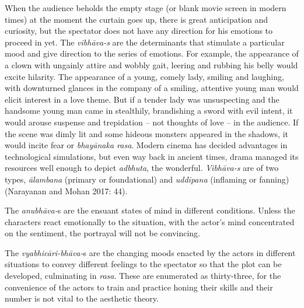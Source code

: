 When the audience beholds the empty stage (or blank movie screen in modern times) at the moment the curtain goes up, there is great anticipation and curiosity, but the spectator does not have any direction for his emotions to proceed in yet. The \textit{vibhāva-s} are the determinants that stimulate a particular mood and give direction to the series of emotions. For example, the appearance of a clown with ungainly attire and wobbly gait, leering and rubbing his belly would excite hilarity. The appearance of a young, comely lady, smiling and laughing, with downturned glances in the company of a smiling, attentive young man would elicit interest in a love theme. But if a tender lady was unsuspecting and the handsome young man came in stealthily, brandishing a sword with evil intent, it would arouse suspense and trepidation – not thoughts of love – in the audience. If the scene was dimly lit and some hideous monsters appeared in the shadows, it would incite fear or \textit{bhayānaka rasa}. Modern cinema has decided advantages in technological simulations, but even way back in ancient times, drama managed its resources well enough to depict \textit{adbhuta}, the wonderful. \textit{Vibhāva-s }are of two types, \textit{ālambana} (primary or foundational) and \textit{uddīpana} (inflaming or fanning) (Narayanan and Mohan 2017: 44).

The \textit{anubhāva-}s are the ensuant states of mind in different conditions. Unless the characters react emotionally to the situation, with the actor’s mind concentrated on the sentiment, the portrayal will not be convincing.

The \textit{vyabhicāri-bhāva-}s are the changing moods enacted by the actors in different situations to convey different feelings to the spectator so that the plot can be developed, culminating in \textit{rasa}. These are enumerated as thirty-three, for the convenience of the actors to train and practice honing their skills and their number is not vital to the aesthetic theory.

